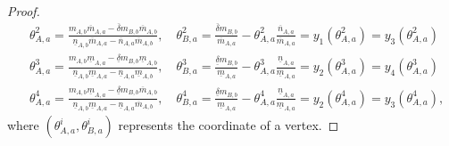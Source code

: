 \documentclass[letterpaper]{article} %
\begin{document}
\begin{proof}
\begin{align*}
    &\theta_{A,a}^2 = \frac{m_{A,b}\overline{m}_{A,a} - \overline{\delta}m_{B,b}\overline{m}_{A,b}}
    {\underline{n}_{A,b}\overline{m}_{A,a} - \overline{n}_{A,a}\overline{m}_{A,b}}, \quad
    \theta_{B,a}^2 = \frac{\overline{\delta} m_{B,b}}{\overline{m}_{A,a}} - \theta_{A,a}^2 \frac{\overline{n}_{A,a}}{\overline{m}_{A,a}} = y_1(\theta_{A,a}^2) = y_3(\theta_{A,a}^2) \\
    &\theta_{A,a}^3 = \frac{m_{A,b}\underline{m}_{A,a} - \underline{\delta}m_{B,b}\underline{m}_{A,b}}
    {\underline{n}_{A,b}\underline{m}_{A,a} - \underline{n}_{A,a}\underline{m}_{A,b}}, \quad
    \theta_{B,a}^3 = \frac{\underline{\delta} m_{B,b}}{\underline{m}_{A,a}} - \theta_{A,a}^3 \frac{\underline{n}_{A,a}}{\underline{m}_{A,a}} = y_2(\theta_{A,a}^3) = y_4(\theta_{A,a}^3) \\
    &\theta_{A,a}^4 = \frac{m_{A,b}\underline{m}_{A,a} - \underline{\delta}m_{B,b}\overline{m}_{A,b}}
    {\underline{n}_{A,b}\underline{m}_{A,a} - \underline{n}_{A,a}\overline{m}_{A,b}} , \quad
    \theta_{B,a}^4 = \frac{\underline{\delta} m_{B,b}}{\underline{m}_{A,a}} - \theta_{A,a}^4 \frac{\underline{n}_{A,a}}{\underline{m}_{A,a}} = y_2(\theta_{A,a}^4) = y_3(\theta_{A,a}^4),
\end{align*}
where $(\theta_{A,a}^i, \theta_{B,a}^i)$ represents the coordinate of a vertex. 


\end{proof}
\end{document}
